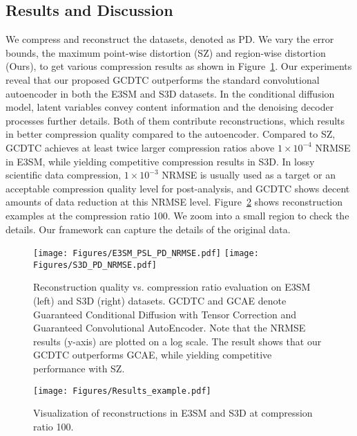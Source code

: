 \subsection{Results and Discussion}
We compress and reconstruct the datasets, denoted as PD. We vary the error bounds, the maximum point-wise distortion (SZ) and region-wise distortion (Ours), to get various compression results as shown in Figure~\ref{fig:compress_result}. Our experiments reveal that our proposed GCDTC outperforms the standard convolutional autoencoder in both the E3SM and S3D datasets. In the conditional diffusion model, latent variables convey content information and the denoising decoder processes further details. Both of them contribute reconstructions, which results in better compression quality compared to the autoencoder. Compared to SZ, GCDTC achieves at least twice larger compression ratios above $1\times 10^{-4}$ NRMSE in E3SM, while yielding competitive compression results in S3D. In lossy scientific data compression, $1\times 10^{-3}$ NRMSE is usually used as a target or an acceptable compression quality level for post-analysis, and GCDTC shows decent amounts of data reduction at this NRMSE level. Figure~\ref{fig:compress_example} shows reconstruction examples at the compression ratio 100. We zoom into a small region to check the details. Our framework can capture the details of the original data.

\begin{figure}[H]  %
    \centering
    \texttt{[image: Figures/E3SM\_PSL\_PD\_NRMSE.pdf]}
    \hfill
    \texttt{[image: Figures/S3D\_PD\_NRMSE.pdf]}
    \caption{Reconstruction quality vs. compression ratio evaluation on E3SM (left) and S3D (right) datasets. GCDTC and GCAE denote Guaranteed Conditional Diffusion with Tensor Correction and Guaranteed Convolutional AutoEncoder. Note that the NRMSE results (y-axis) are plotted on a log scale. The result shows that our GCDTC outperforms GCAE, while yielding competitive performance with SZ.}
    \label{fig:compress_result}
\end{figure}

\FloatBarrier  %

\begin{figure}[H]  %
    \centering
    \texttt{[image: Figures/Results\_example.pdf]}
    \caption{Visualization of reconstructions in E3SM and S3D at compression ratio 100.}
    \label{fig:compress_example}
\end{figure}

